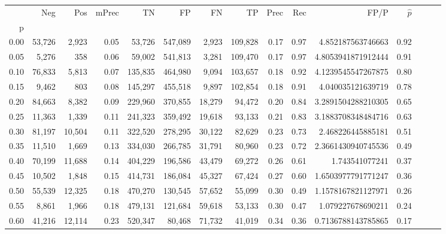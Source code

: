 \begin{tabular}{rrrrrrrrrrrrrrr}
\toprule
{} &     Neg &     Pos & mPrec &       TN &       FP &       FN &       TP &  Prec &   Rec &                  FP/P & $\hat{p}$ \\
p    &         &         &       &          &          &          &          &       &       &                       &           \\
\midrule
0.00 &  53,726 &   2,923 &  0.05 &   53,726 &  547,089 &    2,923 &  109,828 &  0.17 &  0.97 &     4.852187563746663 &      0.92 \\
0.05 &   5,276 &     358 &  0.06 &   59,002 &  541,813 &    3,281 &  109,470 &  0.17 &  0.97 &    4.8053941871912444 &      0.91 \\
0.10 &  76,833 &   5,813 &  0.07 &  135,835 &  464,980 &    9,094 &  103,657 &  0.18 &  0.92 &    4.1239545547267875 &      0.80 \\
0.15 &   9,462 &     803 &  0.08 &  145,297 &  455,518 &    9,897 &  102,854 &  0.18 &  0.91 &     4.040035121639719 &      0.78 \\
0.20 &  84,663 &   8,382 &  0.09 &  229,960 &  370,855 &   18,279 &   94,472 &  0.20 &  0.84 &    3.2891504288210305 &      0.65 \\
0.25 &  11,363 &   1,339 &  0.11 &  241,323 &  359,492 &   19,618 &   93,133 &  0.21 &  0.83 &    3.1883708348484716 &      0.63 \\
0.30 &  81,197 &  10,504 &  0.11 &  322,520 &  278,295 &   30,122 &   82,629 &  0.23 &  0.73 &     2.468226445885181 &      0.51 \\
0.35 &  11,510 &   1,669 &  0.13 &  334,030 &  266,785 &   31,791 &   80,960 &  0.23 &  0.72 &    2.3661430940745536 &      0.49 \\
0.40 &  70,199 &  11,688 &  0.14 &  404,229 &  196,586 &   43,479 &   69,272 &  0.26 &  0.61 &        1.743541077241 &      0.37 \\
0.45 &  10,502 &   1,848 &  0.15 &  414,731 &  186,084 &   45,327 &   67,424 &  0.27 &  0.60 &    1.6503977791771247 &      0.36 \\
0.50 &  55,539 &  12,325 &  0.18 &  470,270 &  130,545 &   57,652 &   55,099 &  0.30 &  0.49 &    1.1578167821127971 &      0.26 \\
0.55 &   8,861 &   1,966 &  0.18 &  479,131 &  121,684 &   59,618 &   53,133 &  0.30 &  0.47 &     1.079227678690211 &      0.24 \\
0.60 &  41,216 &  12,114 &  0.23 &  520,347 &   80,468 &   71,732 &   41,019 &  0.34 &  0.36 &    0.7136788143785865 &      0.17 \\

\end{tabular}
